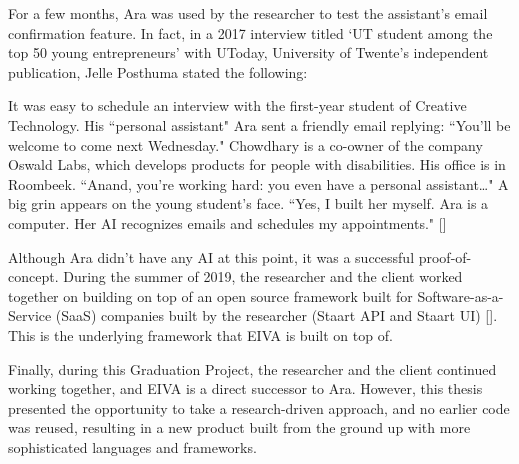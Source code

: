 \documentclass{article}
\begin{document}
For a few months, Ara was used by the researcher to test the assistant's email confirmation feature. In fact, in a 2017 interview titled `UT student among the top 50 young entrepreneurs' with UToday, University of Twente's independent publication, Jelle Posthuma stated the following:

\begin{displayquote}
	It was easy to schedule an interview with the first-year student of Creative Technology. His ``personal assistant" Ara sent a friendly email replying: ``You’ll be welcome to come next Wednesday." Chowdhary is a co-owner of the company Oswald Labs, which develops products for people with disabilities. His office is in Roombeek. ``Anand, you’re working hard: you even have a personal assistant…" A big grin appears on the young student’s face. ``Yes, I built her myself. Ara is a computer. Her AI recognizes emails and schedules my appointments." []
\end{displayquote}

Although Ara didn't have any AI at this point, it was a successful proof-of-concept. During the summer of 2019, the researcher and the client worked together on building on top of an open source framework built for Software-as-a-Service (SaaS) companies built by the researcher (Staart API and Staart UI) []. This is the underlying framework that EIVA is built on top of.

Finally, during this Graduation Project, the researcher and the client continued working together, and EIVA is a direct successor to Ara. However, this thesis presented the opportunity to take a research-driven approach, and no earlier code was reused, resulting in a new product built from the ground up with more sophisticated languages and frameworks.
\end{document}
